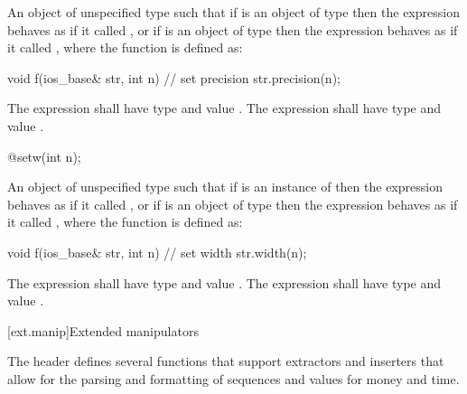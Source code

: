 \begin{itemdescr}
\pnum
\returns
An object of unspecified type such that if
is an object of type
then the expression
behaves as if it called
,
or if
is an object of type
then the expression
behaves as if it called
, where the function  is defined as:

\begin{codeblock}
void f(ios_base& str, int n) {
  // set precision
  str.precision(n);
}
\end{codeblock}

The expression
shall have type
and value
.
The expression
shall have type
and value
.
\end{itemdescr}

%
\begin{itemdecl}
@\unspec@ setw(int n);
\end{itemdecl}

\begin{itemdescr}
\pnum
\returns
An object of unspecified type such that if
is an instance of
then the expression
behaves as if it called
,
or if
is an object of type
then the expression
behaves as if it called
, where the function  is defined as:

\begin{codeblock}
void f(ios_base& str, int n) {
  // set width
  str.width(n);
}
\end{codeblock}

The expression
shall have type
and value
.
The expression
shall have type
and value
.
\end{itemdescr}

[ext.manip]{Extended manipulators}

\pnum
The header  defines several functions that support extractors and inserters that allow for the
parsing and formatting of sequences and values for money and time.

